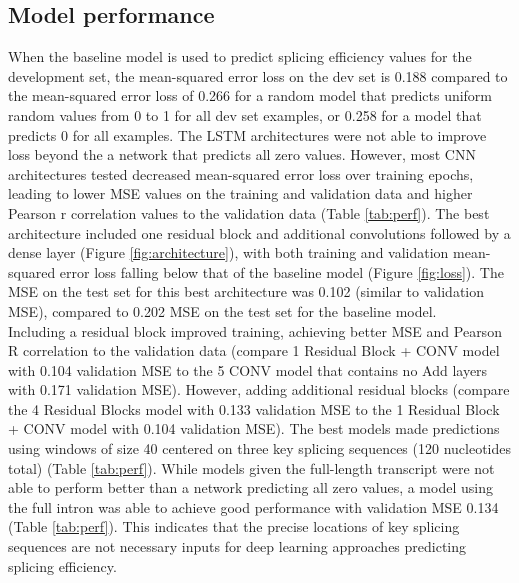 \documentclass{article}
\begin{document}
\subsection{Model performance} 
When the baseline model is used to predict splicing efficiency values for the development set, the mean-squared error loss on the dev set is 0.188 compared to the mean-squared error loss of 0.266 for a random model that predicts uniform random values from 0 to 1 for all dev set examples, or 0.258 for a model that predicts 0 for all examples. The LSTM architectures were not able to improve loss beyond the a network that predicts all zero values. However, most CNN architectures tested decreased mean-squared error loss over training epochs, leading to lower MSE values on the training and validation data and higher Pearson r correlation values to the validation data (Table \ref{tab:perf}). The best architecture included one residual block and additional convolutions followed by a dense layer (Figure \ref{fig:architecture}), with both training and validation mean-squared error loss falling below that of the baseline model (Figure \ref{fig:loss}). The MSE on the test set for this best architecture was 0.102 (similar to validation MSE), compared to 0.202 MSE on the test set for the baseline model. \newline \\
Including a residual block improved training, achieving better MSE and Pearson R correlation to the validation data (compare 1 Residual Block + CONV model with 0.104 validation MSE to the 5 CONV model that contains no Add layers with 0.171 validation MSE). However, adding additional residual blocks (compare the 4 Residual Blocks model with 0.133 validation MSE to the 1 Residual Block + CONV model with 0.104 validation MSE). The best models made predictions using windows of size 40 centered on three key splicing sequences (120 nucleotides total) (Table \ref{tab:perf}). While models given the full-length transcript were not able to perform better than a network predicting all zero values, a model using the full intron was able to achieve good performance with validation MSE 0.134 (Table \ref{tab:perf}). This indicates that the precise locations of key splicing sequences are not necessary inputs for deep learning approaches predicting splicing efficiency. 
\end{document}
